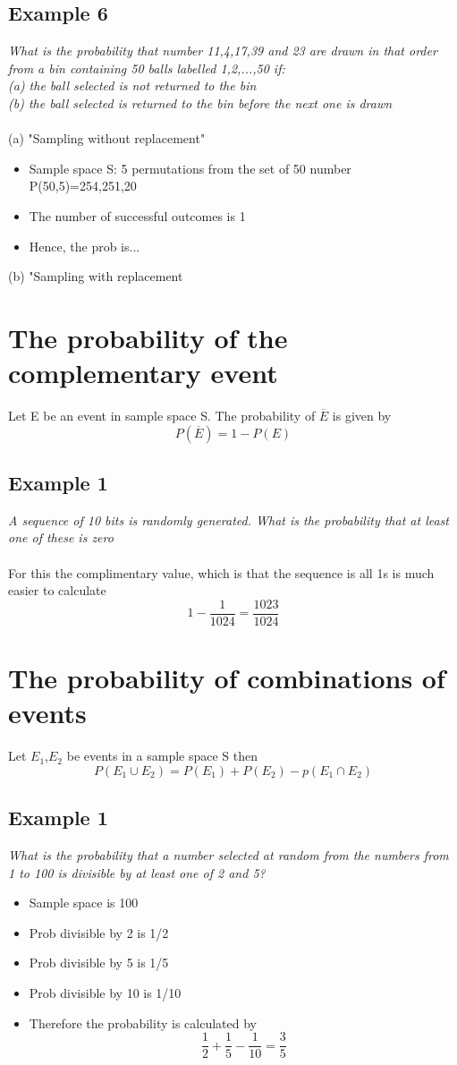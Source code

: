 \documentclass{article}[18pt]
\begin{document}
\subsection{Example 6}
\textit{What is the probability that number 11,4,17,39 and 23 are drawn in that order from a bin containing 50 balls labelled 1,2,...,50 if:\\
(a) the ball selected is not returned to the bin\\
(b) the ball selected is returned to the bin before the next one is drawn
}\\
\\
(a) "Sampling without replacement"
\begin{itemize}
\item Sample space S: 5 permutations from the set of 50 number P(50,5)=254,251,20
\item The number of successful outcomes is 1
\item Hence, the prob is...
\end{itemize}
(b) "Sampling with replacement
\section{The probability of the complementary event}
Let E be an event in sample space S. The probability of $\overline{E}$ is given by
$$P(\overline{E})=1-P(E)$$
\subsection{Example 1}
\textit{A sequence of 10 bits is randomly generated. What is the probability that at least one of these is zero}\\
\\
For this the complimentary value, which is that the sequence is all 1s is much easier to calculate
$$1-\frac{1}{1024}=\frac{1023}{1024}$$
\section{The probability of combinations of events}
Let $E_1$,$E_2$ be events in a sample space S then
$$P(E_1\cup E_2)=P(E_1)+P(E_2)-p(E_1\cap E_2)$$
\subsection{Example 1}
\textit{What is the probability that a number selected at random from the numbers from 1 to 100 is divisible by at least one of 2 and 5?}
\begin{itemize}
\item Sample space is 100
\item Prob divisible by 2 is 1/2
\item Prob divisible by 5 is 1/5
\item Prob divisible by 10 is 1/10
\item Therefore the probability is calculated by
$$\frac{1}{2}+\frac{1}{5}-\frac{1}{10}=\frac{3}{5}$$
\end{itemize}
\end{document}
